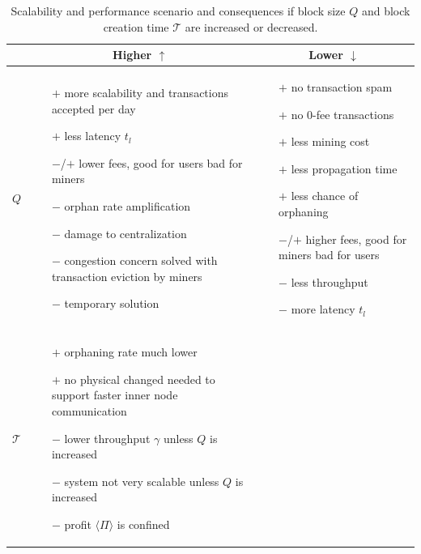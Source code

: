 \documentclass[USenglish]{uit-thesis}
\begin{document}
\begin{table}
	\centering
	\caption{Scalability and performance scenario and consequences if block size $Q$ and block creation time $\mathcal{T}$ are increased or decreased.}
	\label{tab:scalability_results}
	\begin{tabular}{|m{0.4cm}|m{4.8cm}|m{4.8cm}|}
	\cline{2-3}
	\multicolumn{1}{c|}{}&
	\multicolumn{1}{c|}{\textbf{Higher $\uparrow$}} &
	\multicolumn{1}{c|}{\textbf{Lower $\downarrow$}} \\ \hline
		 \textbf{$Q$}&\begin{itemize}
			\item [$+$] more scalability and transactions accepted per day
			\item [$+$] less latency $t_l$
			\item [$-$/$+$] lower fees, good for users bad for miners
			\item [$-$] orphan rate amplification
			\item [$-$] damage to centralization
			\item [$-$] congestion concern solved
			with transaction eviction by miners
			\item [$-$] temporary solution
		\end{itemize}&\begin{itemize}
			\item [$+$] no transaction spam
			\item [$+$] no $0$-fee transactions
			\item [$+$] less mining cost
			\item [$+$] less propagation time
			\item [$+$] less chance of orphaning
			\item [$-$/$+$] higher fees, good for miners bad for users
			\item [$-$] less throughput
			\item [$-$] more latency $t_l$
		\end{itemize}\\ \midrule
		\hline
		\textbf{$\mathcal{T}$}&\begin{itemize}
			\item [$+$] orphaning rate much lower
			\item [$+$] no physical changed needed to support faster inner node communication
			\item [$-$] lower throughput $\gamma$ unless $Q$ is increased
			\item [$-$] system not very scalable unless $Q$ is increased
			\item [$-$] profit $\langle \Pi \rangle$ is confined

\end{itemize}
\end{tabular}
\end{table}
\end{document}
